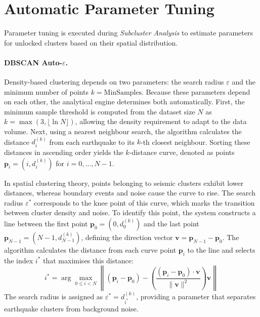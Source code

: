 \section{Automatic Parameter Tuning}
\label{sec:auto-tuning}

Parameter tuning is executed during \textit{Subcluster Analysis} to estimate parameters for unlocked clusters based on their spatial distribution. 

\paragraph{DBSCAN Auto-$\varepsilon$.}
Density-based clustering depends on two parameters: the search radius $\varepsilon$ and the minimum number of points $k = \text{MinSamples}$. Because these parameters depend on each other, the analytical engine determines both automatically. First, the minimum sample threshold is computed from the dataset size $N$ as $k = \max(3, \lfloor \ln N \rfloor)$, allowing the density requirement to adapt to the data volume. Next, using a nearest neighbour search, the algorithm calculates the distance $d_i^{(k)}$ from each earthquake to its $k$-th closest neighbour. Sorting these distances in ascending order yields the $k$-distance curve, denoted as points $\mathbf{p}_i = (i, d_i^{(k)})$ for $i = 0, \dots, N-1$.

In spatial clustering theory, points belonging to seismic clusters exhibit lower distances, whereas boundary events and noise cause the curve to rise. The search radius $\varepsilon^*$ corresponds to the knee point of this curve, which marks the transition between cluster density and noise. To identify this point, the system constructs a line between the first point $\mathbf{p}_0 = (0, d_0^{(k)})$ and the last point $\mathbf{p}_{N-1} = (N-1, d_{N-1}^{(k)})$, defining the direction vector $\mathbf{v} = \mathbf{p}_{N-1} - \mathbf{p}_0$. The algorithm calculates the distance from each curve point $\mathbf{p}_i$ to the line and selects the index $i^*$ that maximises this distance:
\begin{equation}
    i^* = \arg\max_{0 \le i < N} \left\| (\mathbf{p}_i - \mathbf{p}_0) - \left( \frac{(\mathbf{p}_i - \mathbf{p}_0) \cdot \mathbf{v}}{\|\mathbf{v}\|^2} \right) \mathbf{v} \right\|
    \label{eq:max-curvature}
\end{equation}
The search radius is assigned as $\varepsilon^* = d_{i^*}^{(k)}$, providing a parameter that separates earthquake clusters from background noise.

